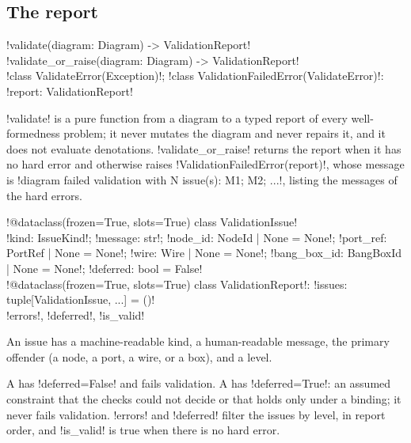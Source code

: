\subsection{The report}

\begin{signature}
\py!validate(diagram: Diagram) -> ValidationReport!\\
\py!validate_or_raise(diagram: Diagram) -> ValidationReport!\\
\py!class ValidateError(Exception)!; \py!class ValidationFailedError(ValidateError)!: \py!report: ValidationReport!
\end{signature}

\py!validate! is a pure function from a diagram to a typed report of every well-formedness problem; it never mutates the diagram and never repairs it, and it does not evaluate denotations. \py!validate_or_raise! returns the report when it has no hard error and otherwise raises \py!ValidationFailedError(report)!, whose message is \code!diagram failed validation with N issue(s): M1; M2; ...!, listing the messages of the hard errors.

\begin{signature}
\py!@dataclass(frozen=True, slots=True) class ValidationIssue!\\
\quad \py!kind: IssueKind!; \py!message: str!; \py!node_id: NodeId | None = None!; \py!port_ref: PortRef | None = None!; \py!wire: Wire | None = None!; \py!bang_box_id: BangBoxId | None = None!; \py!deferred: bool = False!\\
\py!@dataclass(frozen=True, slots=True) class ValidationReport!: \py!issues: tuple[ValidationIssue, ...] = ()!\\
\quad \py!errors!, \py!deferred!, \py!is_valid!
\end{signature}

An issue has a machine-readable kind, a human-readable message, the primary offender (a node, a port, a wire, or a box), and a level. \begin{definition}\label{def:diagrams-levels}
A  has \py!deferred=False! and fails validation. A  has \py!deferred=True!: an assumed constraint that the checks could not decide or that holds only under a binding; it never fails validation. \py!errors! and \py!deferred! filter the issues by level, in report order, and \py!is_valid! is true when there is no hard error.
\end{definition}

